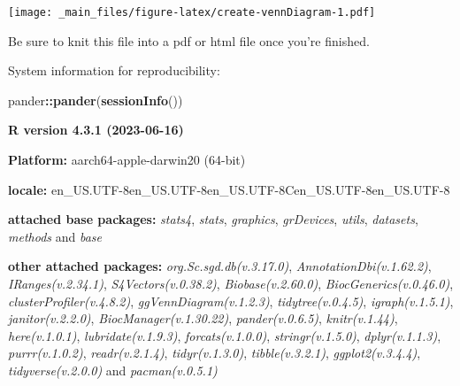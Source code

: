 \documentclass[
]{book}
\newenvironment{Shaded}{\begin{snugshade}}{\end{snugshade}}
\newcommand{\FunctionTok}[1]{\textcolor[rgb]{0.13,0.29,0.53}{\textbf{#1}}}
\newcommand{\NormalTok}[1]{#1}
\newcommand{\SpecialCharTok}[1]{\textcolor[rgb]{0.81,0.36,0.00}{\textbf{#1}}}
\begin{document}
\texttt{[image: \_main\_files/figure-latex/create-vennDiagram-1.pdf]}

Be sure to knit this file into a pdf or html file once you're finished.

System information for reproducibility:

\begin{Shaded}
\begin{Highlighting}[]
\NormalTok{pander}\SpecialCharTok{::}\FunctionTok{pander}\NormalTok{(}\FunctionTok{sessionInfo}\NormalTok{())}
\end{Highlighting}
\end{Shaded}

\textbf{R version 4.3.1 (2023-06-16)}

\textbf{Platform:} aarch64-apple-darwin20 (64-bit)

\textbf{locale:}
en\_US.UTF-8\textbar\textbar en\_US.UTF-8\textbar\textbar en\_US.UTF-8\textbar\textbar C\textbar\textbar en\_US.UTF-8\textbar\textbar en\_US.UTF-8

\textbf{attached base packages:}
\emph{stats4}, \emph{stats}, \emph{graphics}, \emph{grDevices}, \emph{utils}, \emph{datasets}, \emph{methods} and \emph{base}

\textbf{other attached packages:}
\emph{org.Sc.sgd.db(v.3.17.0)}, \emph{AnnotationDbi(v.1.62.2)}, \emph{IRanges(v.2.34.1)}, \emph{S4Vectors(v.0.38.2)}, \emph{Biobase(v.2.60.0)}, \emph{BiocGenerics(v.0.46.0)}, \emph{clusterProfiler(v.4.8.2)}, \emph{ggVennDiagram(v.1.2.3)}, \emph{tidytree(v.0.4.5)}, \emph{igraph(v.1.5.1)}, \emph{janitor(v.2.2.0)}, \emph{BiocManager(v.1.30.22)}, \emph{pander(v.0.6.5)}, \emph{knitr(v.1.44)}, \emph{here(v.1.0.1)}, \emph{lubridate(v.1.9.3)}, \emph{forcats(v.1.0.0)}, \emph{stringr(v.1.5.0)}, \emph{dplyr(v.1.1.3)}, \emph{purrr(v.1.0.2)}, \emph{readr(v.2.1.4)}, \emph{tidyr(v.1.3.0)}, \emph{tibble(v.3.2.1)}, \emph{ggplot2(v.3.4.4)}, \emph{tidyverse(v.2.0.0)} and \emph{pacman(v.0.5.1)}
\end{document}
